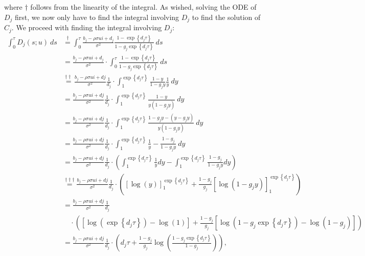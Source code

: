 \documentclass[11pt]{article}
\numberwithin{equation}{section}
\begin{document}
where $\dagger$ follows from the linearity of the integral. As wished, solving the ODE of $D_j$ first, we now only have to find the integral
involving $D_j$ to find the solution of $C_j$. We proceed with finding the integral involving $D_j$:
\begin{align*}
    \int_0^\tau D_j(s;u)\:ds&\overset{\dagger}{=}\int_0^\tau \frac{b_j-\rho \sigma u i + d_j}{\sigma^2} \frac{1-\exp\left\{d_j \tau\right\}}{1-g_j \exp\left\{d_j \tau\right\}} \:ds\\
    &= \frac{b_j-\rho \sigma u i + d_j}{\sigma^2}\cdot \int_0^\tau\frac{1-\exp\left\{d_j \tau\right\}}{1-g_j \exp\left\{d_j \tau\right\}} \:ds\\
    &\overset{\dagger\dagger}{=}\frac{b_j-\rho \sigma u i+d j}{\sigma^2} \frac{1}{d_j} \cdot\int_{1}^{\exp\left\{d_j \tau\right\}} \frac{1-y}{1-g_j y} \frac{1}{y} \:dy \\
    & =\frac{b_j-\rho \sigma u i+d j}{\sigma^2} \frac{1}{d_j} \cdot\int_{1}^{\exp\left\{d_j \tau\right\}} \frac{1-y}{y\left(1-g_j y\right)} \:dy \\
    & =\frac{b_j-\rho \sigma u i+d j}{\sigma^2} \frac{1}{d_j}\cdot \int_{1}^{\exp\left\{d_j \tau\right\}} \frac{1-g_j y-\left(y-g_j y\right)}{y\left(1-g_j y\right)} \:dy \\
    & =\frac{b_j-\rho \sigma u i+d j}{\sigma^2} \frac{1}{d_j} \cdot\int_{1}^{\exp\left\{d_j \tau\right\}} \frac{1}{y}-\frac{1-g_j}{1-g_j y} \:dy \\
    & =\frac{b_j-\rho \sigma u i+d j}{\sigma^2} \frac{1}{d_j}\cdot\left(\int_{1}^{\exp\left\{d_j \tau\right\}} \frac{1}{y} d y-\int_{1}^{\exp\left\{d_j \tau\right\}} \frac{1-g_j}{1-g_j y} d y\right)\\
    &\overset{\dagger\dagger\dagger}{=}\frac{b_j-\rho \sigma u i+d j}{\sigma^2} \frac{1}{d_j}\cdot \left ( \left [ \log{(y)}\right ]_1^{\exp\left\{d_j \tau\right\}}+\frac{1-g_j}{g_j} \left [ \log{(1-g_jy)}\right ]_1^{\exp\left\{d_j \tau\right\}}\right )\\
    & =\frac{b_j-\rho \sigma u i+d j}{\sigma^2} \frac{1}{d_j}\\&\quad \cdot \left(\left[\log \left(\exp\left\{d_j \tau\right\} \right)-\log{(1)}\right]+\frac{1-g_j}{g_j}\left[\log \left(1-g_j \exp\left\{d_j \tau\right\}\right)-\log \left(1-g_j \right)\right]\right) \\
    &=\frac{b_j-\rho \sigma u i+d j}{\sigma^2} \frac{1}{d_j}\cdot\left(d_j \tau+\frac{1-g_j}{g_j} \log \left(\frac{1-g_j \exp\left\{d_j \tau\right\}}{1-g_j}\right)\right),
\end{align*}
\end{document}
